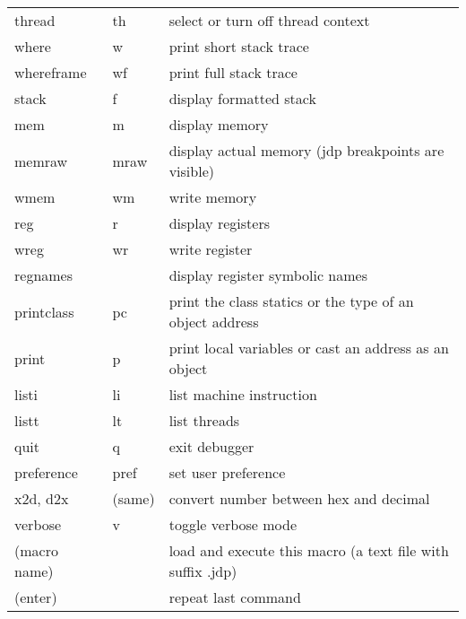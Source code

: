 \begin{tabular}{|l|l|l|}
thread        & th  & select or turn off thread context                         \\ 
where         & w   & print short stack trace                                   \\ 
whereframe    & wf  & print full stack trace                                    \\ 
stack         & f   & display formatted stack                                   \\ 
mem           & m   & display memory                                            \\ 
memraw        & mraw & display actual memory (jdp breakpoints are visible)      \\ 
wmem          & wm  & write memory                                              \\ 
reg           & r   & display registers                                         \\ 
wreg          & wr  & write register                                            \\ 
regnames      &     & display register symbolic names                           \\ 
printclass    & pc  & print the class statics or the type of an object address  \\ 
print         & p   & print local variables or cast an address as an object     \\ 
listi         & li  & list machine instruction                                  \\ 
listt         & lt  & list threads                                              \\ \hline 

quit          & q   & exit debugger                                             \\ 
preference    & pref & set user preference                                      \\ 
x2d, d2x      & (same) & convert number between hex and decimal                 \\
verbose       & v   & toggle verbose mode                                       \\ 
(macro name)  &   & load and execute this macro (a text file with suffix .jdp)  \\ 
(enter)       &   & repeat last command                                         \\ \hline 
\end{tabular}

